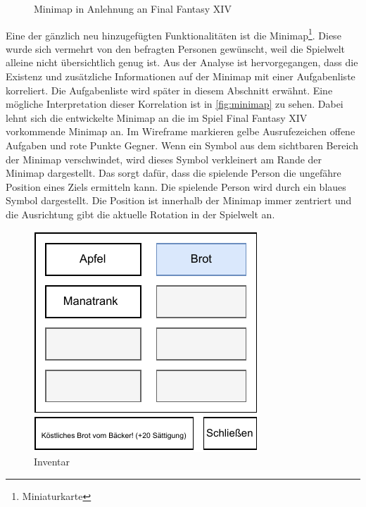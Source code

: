 \begin{figure}[H]%
    \centering
    \qquad
    \caption{Minimap in Anlehnung an Final Fantasy XIV}%
    \label{fig:minimap}%
\end{figure}

Eine der gänzlich neu hinzugefügten Funktionalitäten ist die Minimap\footnote{Miniaturkarte}.
Diese wurde sich vermehrt von den befragten Personen gewünscht, weil die Spielwelt alleine nicht übersichtlich genug ist.
Aus der Analyse ist hervorgegangen, dass die Existenz und zusätzliche Informationen auf der Minimap mit einer Aufgabenliste korreliert.
Die Aufgabenliste wird später in diesem Abschnitt erwähnt.
Eine mögliche Interpretation dieser Korrelation ist in \autoref{fig:minimap} zu sehen.
Dabei lehnt sich die entwickelte Minimap an die im Spiel Final Fantasy XIV vorkommende Minimap an.
Im Wireframe markieren gelbe Ausrufezeichen offene Aufgaben und rote Punkte Gegner.
Wenn ein Symbol aus dem sichtbaren Bereich der Minimap verschwindet, wird dieses Symbol verkleinert am Rande der Minimap dargestellt.
Das sorgt dafür, dass die spielende Person die ungefähre Position eines Ziels ermitteln kann.
Die spielende Person wird durch ein blaues Symbol dargestellt.
Die Position ist innerhalb der Minimap immer zentriert und die Ausrichtung gibt die aktuelle Rotation in der Spielwelt an.

\begin{figure}[H]
    \centering
    \includegraphics[width=0.5\columnwidth]{figures/wireframes/inventory.pdf}
    \caption{\label{fig:inventory}Inventar}
\end{figure}

